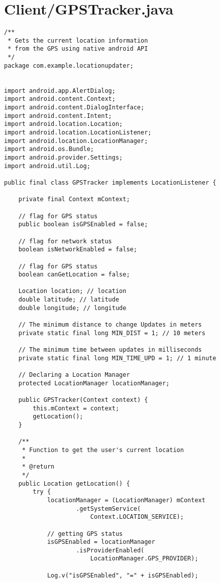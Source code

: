 \documentclass[conference]{IEEEtran}
\begin{document}
\section{Client/GPSTracker.java}
\begin{lstlisting}
/**
 * Gets the current location information 
 * from the GPS using native android API
 */
package com.example.locationupdater;


import android.app.AlertDialog;
import android.content.Context;
import android.content.DialogInterface;
import android.content.Intent;
import android.location.Location;
import android.location.LocationListener;
import android.location.LocationManager;
import android.os.Bundle;
import android.provider.Settings;
import android.util.Log;

public final class GPSTracker implements LocationListener {

    private final Context mContext;

    // flag for GPS status
    public boolean isGPSEnabled = false;

    // flag for network status
    boolean isNetworkEnabled = false;

    // flag for GPS status
    boolean canGetLocation = false;

    Location location; // location
    double latitude; // latitude
    double longitude; // longitude

    // The minimum distance to change Updates in meters
    private static final long MIN_DIST = 1; // 10 meters

    // The minimum time between updates in milliseconds
    private static final long MIN_TIME_UPD = 1; // 1 minute

    // Declaring a Location Manager
    protected LocationManager locationManager;

    public GPSTracker(Context context) {
        this.mContext = context;
        getLocation();
    }

    /**
     * Function to get the user's current location
     * 
     * @return
     */
    public Location getLocation() {
        try {
            locationManager = (LocationManager) mContext
                    .getSystemService(
                        Context.LOCATION_SERVICE);

            // getting GPS status
            isGPSEnabled = locationManager
                    .isProviderEnabled(
                        LocationManager.GPS_PROVIDER);

            Log.v("isGPSEnabled", "=" + isGPSEnabled);


\end{lstlisting}
\end{document}
